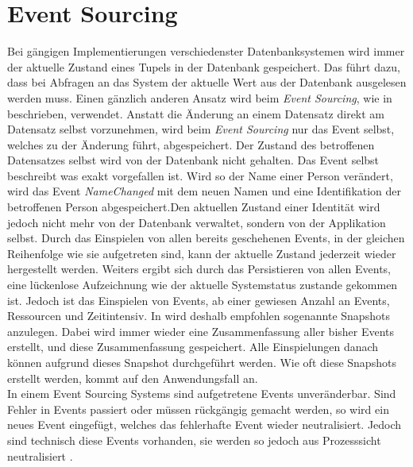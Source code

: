 \section{Event Sourcing}
Bei gängigen Implementierungen verschiedenster Datenbanksystemen wird immer der aktuelle Zustand eines Tupels in der Datenbank gespeichert. Das führt dazu, dass bei Abfragen an das System der aktuelle Wert aus der Datenbank ausgelesen werden muss. Einen gänzlich anderen Ansatz wird beim \textit{Event Sourcing}, wie in \cite{vernon2013implementing} beschrieben, verwendet. Anstatt die Änderung an einem Datensatz direkt am Datensatz selbst vorzunehmen, wird beim \textit{Event Sourcing} nur das Event selbst, welches zu der Änderung führt, abgespeichert. Der Zustand des betroffenen Datensatzes selbst wird von der Datenbank nicht gehalten. Das Event selbst beschreibt was exakt vorgefallen ist. Wird so der Name einer Person verändert, wird das Event \textit{NameChanged} mit dem neuen Namen und eine Identifikation der betroffenen Person abgespeichert.Den aktuellen Zustand einer Identität wird jedoch nicht mehr von der Datenbank verwaltet, sondern von der Applikation selbst. Durch das Einspielen von allen bereits geschehenen Events, in der gleichen Reihenfolge wie sie aufgetreten sind, kann der aktuelle Zustand jederzeit wieder hergestellt werden. Weiters ergibt sich durch das Persistieren von allen Events, eine lückenlose Aufzeichnung wie der aktuelle Systemstatus zustande gekommen ist. \cite{vernon2013implementing} 
Jedoch ist das Einspielen von Events, ab einer gewiesen Anzahl an Events, Ressourcen und Zeitintensiv. In \cite{vernon2013implementing} wird deshalb empfohlen sogenannte Snapshots  anzulegen. Dabei wird immer wieder eine Zusammenfassung aller bisher Events erstellt, und diese Zusammenfassung gespeichert.  Alle Einspielungen danach können aufgrund dieses Snapshot durchgeführt werden. Wie oft diese Snapshots erstellt werden, kommt auf den Anwendungsfall an. \\
In einem Event Sourcing Systems sind aufgetretene Events unveränderbar. Sind Fehler in Events passiert oder müssen rückgängig gemacht werden, so wird ein neues Event eingefügt, welches das fehlerhafte Event wieder neutralisiert. Jedoch sind technisch diese Events vorhanden, sie werden so jedoch aus Prozesssicht neutralisiert \citep{vernon2013implementing}. 
